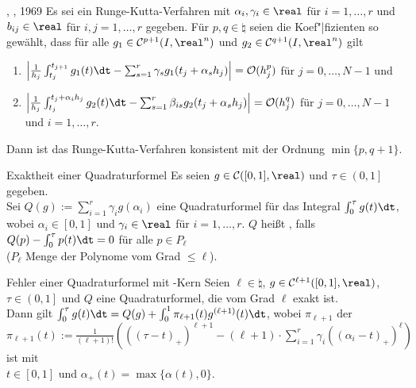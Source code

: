 \begin{Satz}{, , 1969}
    Es sei ein Runge-Kutta-Verfahren mit $\alpha_i, \gamma_i \in \real$ für
    $i = 1, \dotsc, r$ und $b_{ij} \in \real$ für $i, j = 1, \dotsc, r$
    gegeben.
    Für $p, q \in \natural$ seien die Koef"|fizienten so gewählt, dass
    für alle $g_1 \in \C^{p+1}(I, \real^n)$ und $g_2 \in \C^{q+1}(I, \real^n)$
    gilt
    \begin{enumerate}[label=(\emph{\roman*})]
        \item
        $\left|\frac{1}{h_j} \int_{t_j}^{t_{j+1}} g_1(t)\dt -
        \sum_{s=1}^r \gamma_s g_1(t_j + \alpha_s h_j)\right| = \O(h_j^p)$
        für $j = 0, \dotsc, N - 1$ und

        \item
        $\left|\frac{1}{h_j} \int_{t_j}^{t_j + \alpha_i h_j} g_2(t)\dt -
        \sum_{s=1}^r \beta_{is} g_2(t_j + \alpha_s h_j)\right| = \O(h_j^q)$
        für $j = 0, \dotsc, N - 1$ und $i = 1, \dotsc, r$.
    \end{enumerate}
    Dann ist das Runge-Kutta-Verfahren konsistent mit der Ordnung
    $\min\{p, q + 1\}$.
\end{Satz}

\linie

\begin{Def}{Exaktheit einer Quadraturformel}
    Es seien $g \in \C([0, 1], \real)$ und $\tau \in \left(0, 1\right]$
    gegeben.\\
    Sei $Q(g) := \sum_{i=1}^r \gamma_i g(\alpha_i)$ eine Quadraturformel
    für das Integral $\int_0^\tau g(t)\dt$, wobei
    $\alpha_i \in [0, 1]$ und $\gamma_i \in \real$ für $i = 1, \dotsc, r$.
    $Q$ heißt , falls
    $Q(p) - \int_0^\tau p(t)\dt = 0$ für alle $p \in P_\ell$\\
    ($P_\ell$ Menge der Polynome vom Grad $\le \ell$).
\end{Def}

\begin{Satz}{Fehler einer Quadraturformel mit -Kern}
    Seien $\ell \in \natural$, $g \in \C^{\ell+1}([0, 1], \real)$,\\
    $\tau \in \left(0, 1\right]$ und
    $Q$ eine Quadraturformel, die vom Grad $\ell$ exakt ist.\\
    Dann gilt $\int_0^\tau g(t)\dt =
    Q(g) + \int_0^1 \pi_{\ell+1}(t) g^{(\ell+1)}(t)\dt$,
    wobei $\pi_{\ell+1}$ der \\
    $\pi_{\ell+1}(t) := \frac{1}{(\ell + 1)!} (((\tau - t)_+)^{\ell+1} -
    (\ell + 1) \cdot \sum_{i=1}^r \gamma_i ((\alpha_i - t)_+)^\ell)$
    ist mit\\
    $t \in [0, 1]$ und $\alpha_+(t) = \max\{\alpha(t), 0\}$.
\end{Satz}

